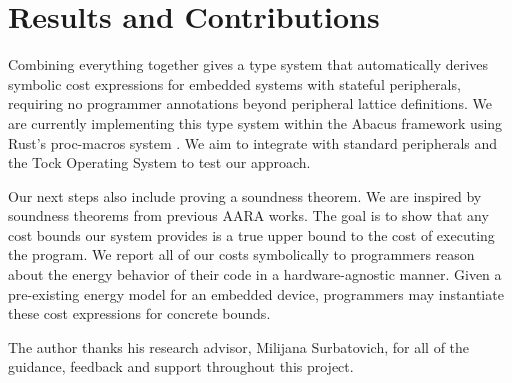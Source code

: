 \documentclass[sigconf, nonacm, screen]{acmart}
\begin{document}


\section{Results and Contributions}
Combining everything together gives a type system that automatically derives symbolic cost expressions for embedded systems with stateful peripherals, requiring no programmer annotations beyond peripheral lattice definitions. We are currently implementing this type system within the Abacus framework using Rust's proc-macros system \cite{rust_procedural_macros_reference}. We aim to integrate with standard peripherals and the Tock Operating System \cite{Levy2017-ii} to test our approach. 

Our next steps also include proving a soundness theorem. We are inspired by soundness theorems from previous AARA works. The goal is to show that any cost bounds our system provides is a true upper bound to the cost of executing the program. We report all of our costs symbolically to programmers reason about the energy behavior of their code in a hardware-agnostic manner. Given a pre-existing energy model for an embedded device, programmers may instantiate these cost expressions for concrete bounds.

\begin{acks}
    The author thanks his research advisor, Milijana Surbatovich, for all of the guidance, feedback and support throughout this project. 
\end{acks}



 
\end{document}
